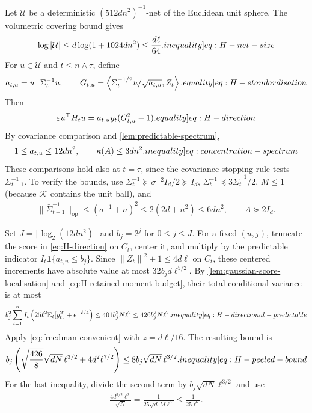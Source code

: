 \documentclass[12pt,cleveref]{jmlr}
\renewenvironment{proof}[1][\proofname]
{\par\noindent{\bfseries\upshape #1\ }}
{\jmlrQED}
\newcommand{\eqlabel}[1]{\label[equality]{#1}}
\newcommand{\ineqlabel}[1]{\label[inequality]{#1}}
\newcommand{\E}{\mathbb E}
\newcommand{\K}{\mathcal K}
\newcommand{\op}{\mathrm{op}}
\newcommand{\1}{\mathbf 1}
\newcommand{\eps}{\varepsilon}
\newcommand{\ip}[2]{\left\langle #1,#2\right\rangle}
\newcommand{\norm}[1]{\left\lVert #1\right\rVert}
\begin{document}
\begin{proof}
    Let $\mathcal U$ be a deterministic
    $(512dn^2)^{-1}$-net of the Euclidean unit sphere. The volumetric
    covering bound gives
    \begin{align}
        \log|\mathcal U|
        \leq d\log(1+1024dn^2)\leq\frac{d\ell}{64}.
        \ineqlabel{eq:H-net-size}
    \end{align}
    For $u\in\mathcal U$ and $t\leq n\wedge\tau$, define
    \begin{align}
        a_{t,u}=u^\top\Sigma_t^{-1}u,
        \qquad
        G_{t,u}=
        \ip{\Sigma_t^{-1/2}u/\sqrt{a_{t,u}}}{Z_t}.
        \eqlabel{eq:H-standardisation}
    \end{align}
    Then
    \begin{align}
        \eps u^\top H_tu
        =a_{t,u}y_t(G_{t,u}^2-1).
        \eqlabel{eq:H-direction}
    \end{align}
    By covariance comparison and \cref{lem:predictable-spectrum},
    \begin{align}
        1\leq a_{t,u}\leq12dn^2,
        \qquad
        \kappa(A)\leq3dn^2.
        \ineqlabel{eq:concentration-spectrum}
    \end{align}
    These comparisons hold also at $t=\tau$, since the covariance
    stopping rule tests $\Sigma_{t+1}^{-1}$. To verify the bounds, use
    $\Sigma_t^{-1}\succeq\sigma^{-2}I_d/2\succeq I_d$,
    $\Sigma_t^{-1}\preceq3\bar{\Sigma}_t^{-1}/2$,
    $M\leq1$ (because $\K$ contains the unit ball), and
    \begin{align}
        \|\bar{\Sigma}_{t+1}^{-1}\|_{\op}
        \leq(\sigma^{-1}+n)^2
        \leq2(2d+n^2)\leq6dn^2,
        \qquad A\succeq2I_d.
    \end{align}

    Set $J=\lceil\log_2(12dn^2)\rceil$ and $b_j=2^j$ for
    $0\leq j\leq J$. For a fixed $(u,j)$, truncate the score in
    \cref{eq:H-direction} on $C_t$, center it, and multiply by
    the predictable indicator $I_t\1\{a_{t,u}\leq b_j\}$.
    Since $\norm{Z_t}^2+1\leq4d\ell$ on $C_t$, these centered increments
    have absolute value at most $32b_jd\ell^{5/2}$.
    By \cref{lem:gaussian-score-localisation} and
    \cref{eq:H-retained-moment-budget}, their total conditional
    variance is at most
    \begin{align}
        b_j^2\sum_{t=1}^n I_t
        \left(25\ell^2\E_t[y_t^2]+e^{-\ell/4}\right)
        \leq401b_j^2N\ell^2\leq426b_j^2N\ell^2.
        \ineqlabel{eq:H-directional-predictable}
    \end{align}
    Apply \cref{eq:freedman-convenient} with $z=d\ell/16$. The resulting
    bound is
    \begin{align}
        b_j\left(
            \sqrt{\frac{426}{8}}\sqrt{dN}\,\ell^{3/2}
        +4d^2\ell^{7/2}\right)
        \leq8b_j\sqrt{dN}\,\ell^{3/2}.
        \ineqlabel{eq:H-peeled-bound}
    \end{align}
    For the last inequality, divide the second term by
    $b_j\sqrt{dN}\ell^{3/2}$ and use
    \begin{align}
        \frac{4d^{3/2}\ell^2}{\sqrt N}
        =\frac{1}{25\sqrt d\,M\ell^6}
        \leq\frac{1}{25\ell^6}.
    \end{align}


\end{proof}
\end{document}

